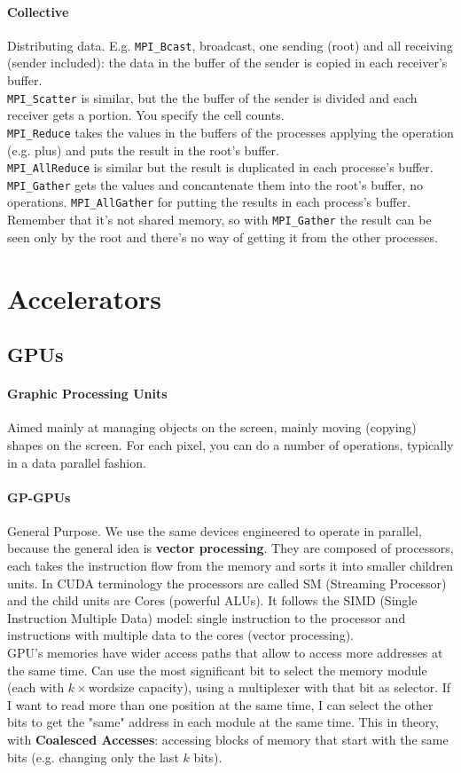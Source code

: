 \documentclass[10pt]{report}
\begin{document}
\paragraph{Collective} Distributing data. E.g. \texttt{MPI\_Bcast}, broadcast, one sending (root) and all receiving (sender included): the data in the buffer of the sender is copied in each receiver's buffer.\\
\texttt{MPI\_Scatter} is similar, but the the buffer of the sender is divided and each receiver gets a portion. You specify the cell counts.\\
\texttt{MPI\_Reduce} takes the values in the buffers of the processes applying the operation (e.g. plus) and puts the result in the root's buffer.\\
\texttt{MPI\_AllReduce} is similar but the result is duplicated in each processe's buffer.\\
\texttt{MPI\_Gather} gets the values and concantenate them into the root's buffer, no operations. \texttt{MPI\_AllGather} for putting the results in each process's buffer. Remember that it's not shared memory, so with \texttt{MPI\_Gather} the result can be seen only by the root and there's no way of getting it from the other processes.
\section{Accelerators}
\subsection{GPUs}
\paragraph{Graphic Processing Units} Aimed mainly at managing objects on the screen, mainly moving (copying) shapes on the screen. For each pixel, you can do a number of operations, typically in a data parallel fashion.
\paragraph{GP-GPUs} General Purpose. We use the same devices engineered to operate in parallel, because the general idea is \textbf{vector processing}. They are composed of processors, each takes the instruction flow from the memory and sorts it into smaller children units. In CUDA terminology the processors are called SM (Streaming Processor) and the child units are Cores (powerful ALUs). It follows the SIMD (Single Instruction Multiple Data) model: single instruction to the processor and instructions with multiple data to the cores (vector processing).\\
GPU's memories have wider access paths that allow to access more addresses at the same time. Can use the most significant bit to select the memory module (each with $k\times$wordsize capacity), using a multiplexer with that bit as selector. If I want to read more than one position at the same time, I can select the other bits to get the "same" address in each module at the same time. This in theory, with \textbf{Coalesced Accesses}: accessing blocks of memory that start with the same bits (e.g. changing only the last $k$ bits).
\end{document}
